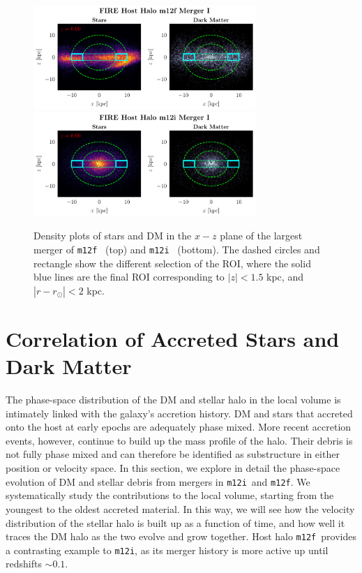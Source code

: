 \documentclass[twocolumn,preprintnumbers]{aastex6}
\newcommand{\mi}{\texttt{m12i}}
\newcommand{\mf}{\texttt{m12f}}
\begin{document}
\begin{figure}[tb] %
   \centering
	\includegraphics[width=0.75\textwidth]{plots/star_dm_position_xzxz_merger_0_snap_600m12f.pdf} 
	\includegraphics[width=0.75\textwidth]{plots/star_dm_position_xzxz_merger_0_snap_600m12i.pdf} 
   \caption{Density plots of stars and DM in the $x-z$ plane of the largest merger of \mf~ (top) and \mi~ (bottom). The dashed circles and rectangle show the different selection of the ROI, where the solid blue lines are the final ROI corresponding to $|z|< 1.5$ kpc, and $|r-r_{\odot}| < 2$ kpc.}
   \label{fig:position_merger}
\end{figure}


\section{Correlation of Accreted Stars and Dark Matter}
\label{sec:correlation}

The phase-space distribution of the DM and stellar halo in the local volume is intimately linked with the galaxy's accretion history.  DM and stars that accreted onto the host at early epochs are adequately phase mixed.  More recent accretion events, however, continue to build up the mass profile of the halo.  Their debris is not fully phase mixed and can therefore be identified as substructure in either position or velocity space. In this section, 
we explore in detail the phase-space evolution of DM and stellar debris from mergers in \mi~and \mf.  We systematically study the contributions to the local volume, starting from the youngest to the oldest accreted material.  In this way, we will see how the velocity distribution of the stellar halo is built up as a function of time, and how well it traces the DM halo as the two evolve and grow together.  Host halo \mf~provides a contrasting example to \mi, as its merger history is more active up until redshifts $\sim0.1$. 
 
\end{document}
